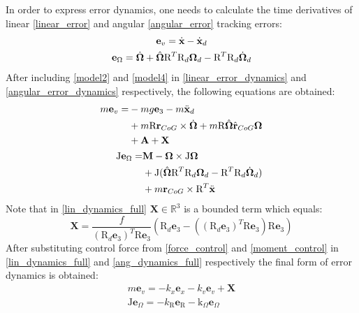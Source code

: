 In order to express error dynamics, one needs to calculate the time derivatives of linear \eqref{linear_error} and angular \eqref{angular_error} tracking errors:
\begin{gather}
	\textbf{e}_v = \dot{\textbf{x}} - \dot{\textbf{x}}_d \label{linear_error_dynamics}\\
	\textbf{e}_\Omega = \dot{\boldsymbol{\Omega}} + \hat{\boldsymbol{\Omega}}\text{R}^T\text{R}_d\boldsymbol{\Omega}_d - \text{R}^T\text{R}_d\dot{\boldsymbol{\Omega}}_d \label{angular_error_dynamics}
\end{gather}
After including \eqref{model2} and \eqref{model4} in \eqref{linear_error_dynamics} and \eqref{angular_error_dynamics} respectively, the following equations are obtained:
\begin{align}
	\label{lin_dynamics_full}
	\begin{split}
		m\textbf{e}_v = & - mg\textbf{e}_3 - m\ddot{\textbf{x}}_d \\
			&+ m\text{R}\textbf{r}_{CoG}  \times \dot{\boldsymbol{\Omega}} + m\text{R}\hat{\boldsymbol{\Omega}}\hat{\textbf{r}}_{CoG}\boldsymbol{\Omega} \\
			&+ \textbf{A} + \textbf{X}	
	\end{split} \\
	\label{ang_dynamics_full}
	\begin{split}
		\text{J}\textbf{e}_\Omega = &\textbf{M} - \boldsymbol{\Omega} \times \text{J}\boldsymbol{\Omega} \\
			&+ \text{J}(\hat{\boldsymbol{\Omega}}\text{R}^T\text{R}_d\boldsymbol{\Omega}_d - \text{R}^T\text{R}_d\dot{\boldsymbol{\Omega}}_d) \\
			&+ m\textbf{r}_{CoG} \times \text{R}^T \ddot{\textbf{x}}
	\end{split}
\end{align}
Note that in \eqref{lin_dynamics_full} $\textbf{X}\in\mathbb{\text{R}}^3$ is a bounded term which equals:
\begin{equation}
	\textbf{X} = \frac{f}{(\text{R}_d\textbf{e}_3)^T\text{R}\textbf{e}_3}(\text{R}_d \textbf{e}_3 - ((\text{R}_d\textbf{e}_3)^T\text{R}\textbf{e}_3)\text{R}\textbf{e}_3)
\end{equation}
After substituting control force from \eqref{force_control} and \eqref{moment_control} in \eqref{lin_dynamics_full} and \eqref{ang_dynamics_full} respectively the final form of error dynamics is obtained:
\begin{gather}
	m\textbf{e}_v = -k_x \textbf{e}_x - k_v \textbf{e}_v + \textbf{X} \label{error_dynamics_linear}\\ 
	\text{J}\textbf{e}_\Omega = -k_\text{R} \textbf{e}_\text{R} - \text{k}_\Omega \textbf{e}_\Omega \label{error_dynamics_angular}
\end{gather}

